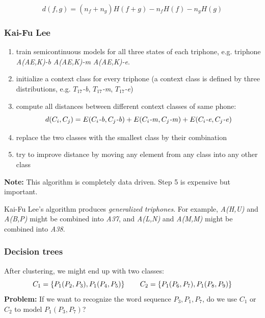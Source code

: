 \documentclass[11pt]{article}
\begin{document}
\[
    d(f, g) = (n_f + n_g) H(f + g) - n_f H(f) - n_g H(g)
\]

\subsubsection{Kai-Fu Lee}
\begin{enumerate}
    \item train semicontinuous models for all three states of each triphone, e.g. triphone \textit{A(AE,K)-b} \textit{A(AE,K)-m} \textit{A(AE,K)-e}.
    \item initialize a context class for every triphone (a context class is defined by three distributions, e.g. \textit{$T_{17}$-b}, \textit{$T_{17}$-m}, \textit{$T_{17}$-e})
    \item compute all distances between different context classes of same phone:
        \[
            d(C_i, C_j) = E(C_i\mbox{\textit{-b}}, C_j\mbox{\textit{-b}}) + E(C_i\mbox{\textit{-m}}, C_j\mbox{\textit{-m}}) + E(C_i\mbox{\textit{-e}}, C_j\mbox{\textit{-e}})
        \]
    \item replace the two classes with the smallest class by their combination
    \item try to improve distance by moving any element from any class into any other class
\end{enumerate}

\vspace{10pt}
\textbf{Note:} This algorithm is completely data driven. Step 5 is expensive but important.
\vspace{10pt}

Kai-Fu Lee's algorithm produces \textit{generalized triphones}. For example, \textit{A(H,U)} and \textit{A(B,P)} might be combined into \textit{A37}, and \textit{A(L,N)} and \textit{A(M,M)} might be combined into \textit{A38}.

\subsubsection{Decision trees}

After clustering, we might end up with two classes:
\[
    C_1 = \left\{P_1(P_2, P_3), P_1(P_4, P_5) \right\} \mbox{\hspace{20pt}} C_2 = \left\{P_1(P_6, P_7), P_1(P_8, P_9) \right\}
\]
\textbf{Problem:} If we want to recognize the word sequence $P_3, P_1, P_7$, do we use $C_1$ or $C_2$ to model $P_1(P_3, P_7)$?

\vspace{5pt}
\end{document}
